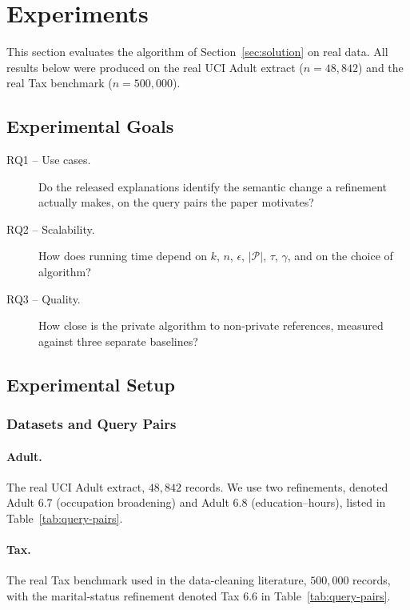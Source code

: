 \section{Experiments}
\label{sec:experiments}

This section evaluates the algorithm of Section~\ref{sec:solution} on real data.
All results below were produced on the real UCI Adult extract ($n=48{,}842$) and the real Tax benchmark ($n=500{,}000$).

\subsection{Experimental Goals}
\label{subsec:experimental-goals}

\begin{description}
  \item[RQ1 -- Use cases.] Do the released explanations identify the semantic change a refinement actually makes, on the query pairs the paper motivates?
  \item[RQ2 -- Scalability.] How does running time depend on $k$, $n$, $\epsilon$, $|\mathcal{P}|$, $\tau$, $\gamma$, and on the choice of algorithm?
  \item[RQ3 -- Quality.] How close is the private algorithm to non-private references, measured against three separate baselines?
\end{description}

\subsection{Experimental Setup}
\label{subsec:experimental-setup}

\subsubsection{Datasets and Query Pairs}
\label{subsubsec:datasets}

\paragraph{Adult.} The real UCI Adult extract, $48{,}842$ records.
We use two refinements, denoted Adult 6.7 (occupation broadening) and Adult 6.8 (education--hours), listed in Table~\ref{tab:query-pairs}.

\paragraph{Tax.} The real Tax benchmark used in the data-cleaning literature, $500{,}000$ records, with the marital-status refinement denoted Tax 6.6 in Table~\ref{tab:query-pairs}.


